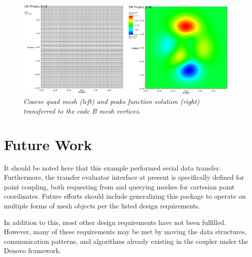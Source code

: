 \documentclass[letterpaper]{article}
\begin{document}
\begin{figure}[htpb!]
  \begin{center}
    \includegraphics[width=6in]{images/sol_B.png}
  \end{center}
  \caption{\small \sl Coarse quad mesh (left) and peaks
    function solution (right) transferred to the code B mesh
    vertices.}
  \label{fig:sol_B}
\end{figure}

\section{Future Work}
It should be noted here that this example performed serial data
transfer. Furthermore, the transfer evaluator interface at present is
specifically defined for point coupling, both requesting from and
querying meshes for cartesian point coordinates. Future efforts should
include generalizing this package to operate on multiple forms of mesh
objects per the listed design requirements.

In addition to this, most other design requirements have not been
fulfilled. However, many of these requirements may be met by moving
the data structures, communication patterns, and algorithms already
existing in the coupler under the Denovo framework.

\pagebreak


\end{document}
